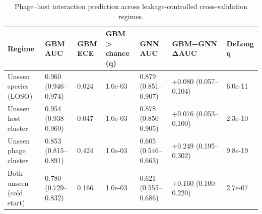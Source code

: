 \begin{table}
\caption{Phage–host interaction prediction across leakage-controlled cross-validation regimes.}
\label{tab:main}
\begin{tabular}{lllllll}
\toprule
Regime & GBM AUC & GBM ECE & GBM > chance (q) & GNN AUC & GBM−GNN ΔAUC & DeLong q \\
\midrule
Unseen species (LOSO) & 0.960 (0.946–0.974) & 0.024 & 1.0e-03 & 0.879 (0.851–0.907) & +0.080 (0.057–0.104) & 6.0e-11 \\
Unseen host cluster & 0.954 (0.938–0.969) & 0.047 & 1.0e-03 & 0.878 (0.850–0.905) & +0.076 (0.053–0.100) & 2.3e-10 \\
Unseen phage cluster & 0.853 (0.815–0.891) & 0.424 & 1.0e-03 & 0.605 (0.546–0.663) & +0.249 (0.195–0.302) & 9.8e-19 \\
Both unseen (cold start) & 0.780 (0.729–0.832) & 0.166 & 1.0e-03 & 0.621 (0.555–0.686) & +0.160 (0.100–0.220) & 2.7e-07 \\
\bottomrule
\end{tabular}
\end{table}
